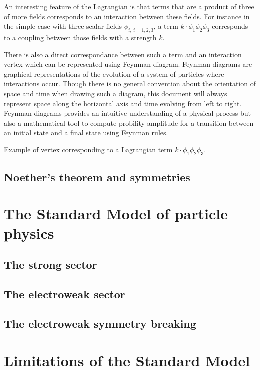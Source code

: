     An interesting feature of the Lagrangian is that terms that are a product
    of three of more fields corresponds to an interaction between these fields.
    For instance in the simple case with three scalar fields $\phi_{i,\ i = 1,2,3}$, 
    a term $k \cdot \phi_1 \phi_2 \phi_3$ corresponds to a coupling between those
    fields with a strength $k$. 
    
    There is also a direct correspondance between such a term and an interaction 
    vertex which can be represented using Feynman diagram. Feynman diagrams are 
    graphical representations of the evolution of a system of particles where 
    interactions occur. Though there is no general convention about the orientation 
    of space and time when drawing such a diagram, this document will always 
    represent space along the horizontal axis and time evolving from left to right.
    Feynman diagrams provides an intuitive understanding of a physical process but 
    also a mathematical tool to compute probility amplitude for a transition between 
    an initial state and a final state using Feynman rules.

                 {Example of vertex corresponding to a Lagrangian term $k \cdot \phi_1 \phi_2 \phi_3$.}

        \subsection{Noether's theorem and symmetries}
        \loremipsum

    \section{The Standard Model of particle physics}
        \subsection{The strong sector}
        \loremipsum
        \subsection{The electroweak sector}
        \loremipsum
        \subsection{The electroweak symmetry breaking}
        \loremipsum

    \section{Limitations of the Standard Model}
